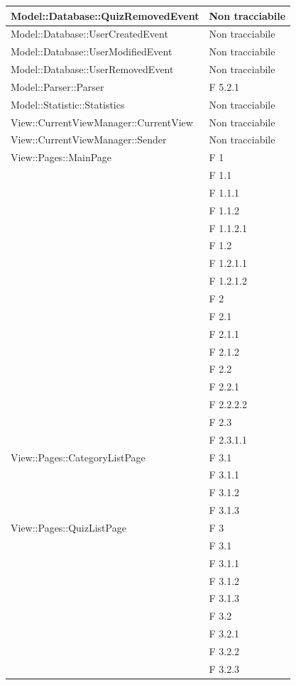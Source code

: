 \documentclass[a4paper,11pt]{article}
\begin{document}
\begin{longtable}{p{}p{}}
\midrule
Model::Database::QuizRemovedEvent	& Non tracciabile\\

\midrule
Model::Database::UserCreatedEvent 	& Non tracciabile\\

\midrule
Model::Database::UserModifiedEvent	& Non tracciabile\\

\midrule
Model::Database::UserRemovedEvent	& Non tracciabile\\

\midrule
Model::Parser::Parser		& F 5.2.1\\

\midrule
Model::Statistic::Statistics	& Non tracciabile\\

\midrule
View::CurrentViewManager::CurrentView	& Non tracciabile\\

\midrule
View::CurrentViewManager::Sender		& Non tracciabile\\

\midrule
View::Pages::MainPage						& F 1\\
								& F 1.1\\
								& F 1.1.1\\
								& F 1.1.2\\
								& F 1.1.2.1\\
								& F 1.2\\
								& F 1.2.1.1\\
								& F 1.2.1.2\\
								& F 2\\
								& F 2.1\\
								& F 2.1.1\\
								& F 2.1.2\\
								& F 2.2\\
								& F 2.2.1\\
								& F 2.2.2.2\\
								& F 2.3\\
								& F 2.3.1.1\\

\midrule
View::Pages::CategoryListPage					& F 3.1\\
								& F 3.1.1\\
								& F 3.1.2\\
								& F 3.1.3\\

\midrule
View::Pages::QuizListPage					& F 3\\
								& F 3.1\\
								& F 3.1.1\\
								& F 3.1.2\\
								& F 3.1.3\\
								& F 3.2\\
								& F 3.2.1\\
								& F 3.2.2\\
								& F 3.2.3\\
								

\end{longtable}
\end{document}
